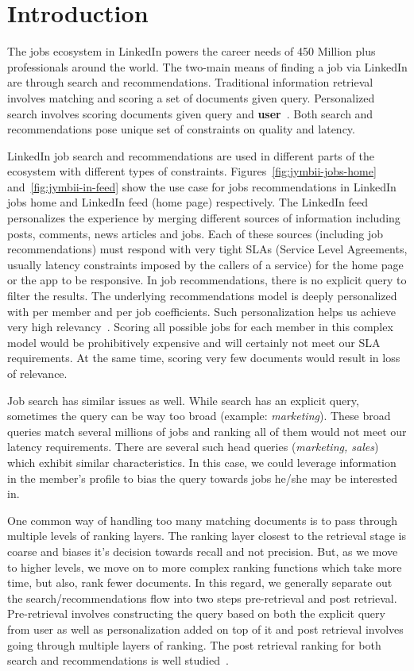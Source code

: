 \section{Introduction}
The jobs ecosystem in LinkedIn powers the career needs of 450 Million plus
professionals around the world. The two-main means of finding a job via
LinkedIn are through search and recommendations. Traditional information
retrieval involves matching and scoring a set of documents given query.
Personalized search involves scoring documents given query and {\bf user}~\cite{liget}.  
Both search and recommendations pose unique set of constraints on quality and
latency.

LinkedIn job search and recommendations are used in different parts of the
ecosystem with different types of constraints. 
Figures~\ref{fig:jymbii-jobs-home} and~\ref{fig:jymbii-in-feed} show the
use case for jobs recommendations in LinkedIn jobs home and LinkedIn feed (home
page) respectively.
The LinkedIn
feed~\cite{agarwal2015personalizing} personalizes the experience by merging
different sources of information including posts, comments, news articles and
jobs. Each of these sources (including job recommendations) must respond with
very tight SLAs (Service Level Agreements, usually latency constraints imposed
by the callers of a service) for the home page or the app to be responsive.
In job recommendations, there is no explicit query to filter the results.
The underlying recommendations model is deeply personalized with per member and
per job coefficients. Such personalization helps us achieve very high
relevancy~\cite{zhang2016glmix}. Scoring all possible jobs for each member in
this complex model would be prohibitively expensive and will certainly not meet
our SLA requirements. At the same time, scoring very few documents would result
in loss of relevance. 

Job search has similar issues as well. While search has an explicit query,
sometimes the query can be way too broad (example: {\it marketing}).
These broad queries match several millions of jobs and ranking all of them
would not meet our latency requirements.
There are several such head queries ({\it marketing, sales}) which exhibit
similar characteristics.
In this case, we
could leverage information in the member's profile to bias the query towards
jobs he/she may be interested in.

One common way of handling too many matching documents is to pass through
multiple levels of ranking layers. The ranking layer closest to the retrieval stage is coarse
and biases it's decision towards recall and not precision. But, as we move to
higher levels, we move on to more complex ranking functions which take more time, but
also, rank fewer documents. In this regard, we generally separate out the
search/recommendations flow into two steps pre-retrieval and post retrieval.
Pre-retrieval involves constructing the query based on both the explicit query
from user as well as personalization added on top of it and post retrieval
involves going through multiple layers of ranking. The post retrieval ranking
for both search and recommendations is well studied~\cite{liu2009learning}. 

